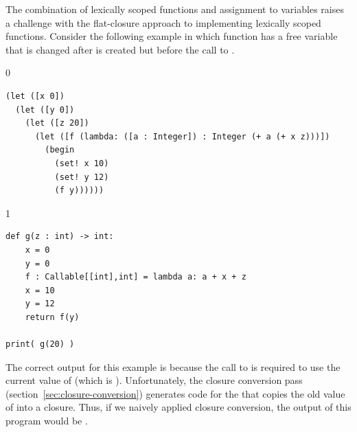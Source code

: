 \documentclass[7x10]{TimesAPriori_MIT}%
\def\racketEd{0}
\def\pythonEd{1}
\def\edition{1}
\newcommand{\pythonColor}[0]{}
\numberwithin{theorem}{chapter}
\numberwithin{definition}{chapter}
\numberwithin{equation}{chapter}
\begin{document}
The combination of lexically scoped functions and assignment to
variables raises a challenge with the flat-closure approach to
implementing lexically scoped functions. Consider the following
example in which function  has a free variable  that
is changed after  is created but before the call to .
{\if\edition\racketEd
\begin{lstlisting}
(let ([x 0])
  (let ([y 0])
    (let ([z 20])
      (let ([f (lambda: ([a : Integer]) : Integer (+ a (+ x z)))])
        (begin
          (set! x 10)
          (set! y 12)
          (f y))))))
\end{lstlisting}
\fi}
{\if\edition\pythonEd\pythonColor
\begin{lstlisting}
def g(z : int) -> int:
    x = 0
    y = 0  
    f : Callable[[int],int] = lambda a: a + x + z
    x = 10
    y = 12
    return f(y)

print( g(20) )
\end{lstlisting}
\fi} The correct output for this example is  because the call
to  is required to use the current value of  (which is
). Unfortunately, the closure conversion pass
(section~\ref{sec:closure-conversion}) generates code for the
 that copies the old value of  into a
closure. Thus, if we naively applied closure conversion, the output of
this program would be .
\end{document}
